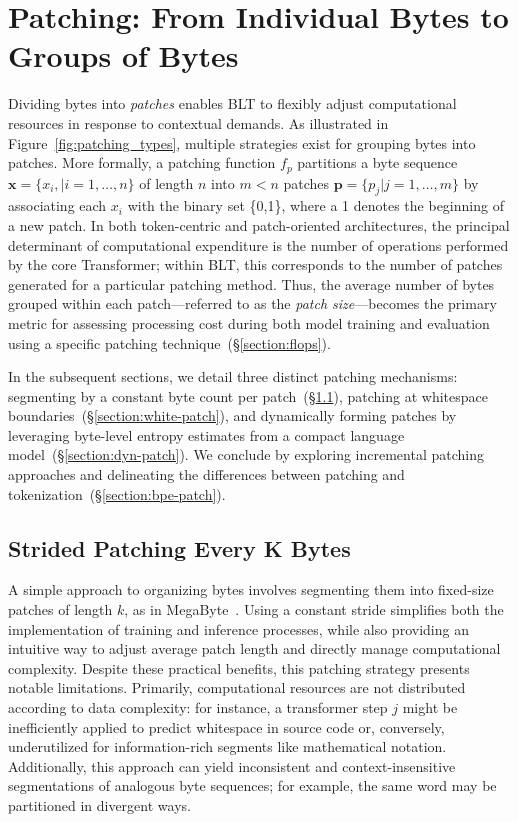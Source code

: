 \section{Patching: From Individual Bytes to Groups of Bytes}
\label{section:patching}

Dividing bytes into \textit{patches} enables {\textsc BLT} to flexibly adjust computational resources in response to contextual demands. As illustrated in Figure~\ref{fig:patching_types}, multiple strategies exist for grouping bytes into patches. More formally, a patching function $f_p$ partitions a byte sequence $\pmb{x} = \{x_i, |i=1,\ldots, n\}$ of length $n$ into $m < n$ patches $\pmb{p} = \{p_j | j = 1, \ldots, m\}$ by associating each $x_i$ with the binary set \{0,1\}, where a 1 denotes the beginning of a new patch. In both token-centric and patch-oriented architectures, the principal determinant of computational expenditure is the number of operations performed by the core Transformer; within {\textsc BLT}, this corresponds to the number of patches generated for a particular patching method. Thus, the average number of bytes grouped within each patch—referred to as the \textit{patch size}—becomes the primary metric for assessing processing cost during both model training and evaluation using a specific patching technique~(\S\ref{section:flops}).

In the subsequent sections, we detail three distinct patching mechanisms: segmenting by a constant byte count per patch~(\S\ref{section:static-patch}), patching at whitespace boundaries~(\S\ref{section:white-patch}), and dynamically forming patches by leveraging byte-level entropy estimates from a compact language model~(\S\ref{section:dyn-patch}). We conclude by exploring incremental patching approaches and delineating the differences between patching and tokenization~(\S\ref{section:bpe-patch}).

\subsection{Strided Patching Every K Bytes}
\label{section:static-patch}

A simple approach to organizing bytes involves segmenting them into fixed-size patches of length $k$, as in MegaByte~\citep{yu2023megabyte}. Using a constant stride simplifies both the implementation of training and inference processes, while also providing an intuitive way to adjust average patch length and directly manage computational complexity. Despite these practical benefits, this patching strategy presents notable limitations. Primarily, computational resources are not distributed according to data complexity: for instance, a transformer step $j$ might be inefficiently applied to predict whitespace in source code or, conversely, underutilized for information-rich segments like mathematical notation. Additionally, this approach can yield inconsistent and context-insensitive segmentations of analogous byte sequences; for example, the same word may be partitioned in divergent ways.

